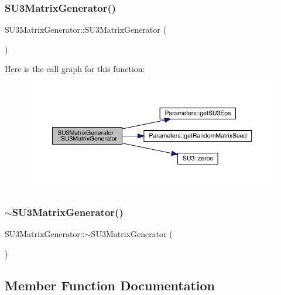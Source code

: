 \subsubsection{\texorpdfstring{SU3MatrixGenerator()}{SU3MatrixGenerator()}}
{\footnotesize\ttfamily S\+U3\+Matrix\+Generator\+::\+S\+U3\+Matrix\+Generator (\begin{DoxyParamCaption}{ }\end{DoxyParamCaption})}

Here is the call graph for this function\+:\nopagebreak
\begin{figure}[H]
\begin{center}
\leavevmode
\includegraphics[width=350pt]{class_s_u3_matrix_generator_ae76a62a4ba6af03901a0cc8e8632e856_cgraph}
\end{center}
\end{figure}
\mbox{\label{class_s_u3_matrix_generator_a58195e1974eed39db617eaea50778f47}} 
\subsubsection{\texorpdfstring{$\sim$SU3MatrixGenerator()}{~SU3MatrixGenerator()}}
{\footnotesize\ttfamily S\+U3\+Matrix\+Generator\+::$\sim$\+S\+U3\+Matrix\+Generator (\begin{DoxyParamCaption}{ }\end{DoxyParamCaption})}



\subsection{Member Function Documentation}
\mbox{\label{class_s_u3_matrix_generator_a06dc59b5a86ba6863b848ef1ca26629a}} 
